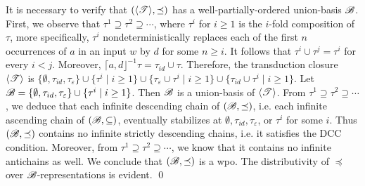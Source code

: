 \begin{example}
It is necessary to verify that $(\langle {\mathscr{T} } \rangle, \preceq)$ has a well-partially-ordered union-basis ${\mathscr{B} }$. First, we observe that $\tau^1 \supseteq \tau^2 \supseteq \cdots$, where $\tau^i$ for $i \ge 1$ is the $i$-fold composition of $\tau$, more specifically, $\tau^i$ nondeterministically replaces each of the first $n $ occurrences of $a$ in an input $w$ by $d$ for some $n \ge i$. It follows that $\tau^i \cup \tau^j = \tau^i$ for every $i < j$.
Moreover, $\lceil a, d \rfloor^{-1} \tau = \tau_{id} \cup \tau$. Therefore, the transduction closure $\langle {\mathscr{T} } \rangle$ is $\{\emptyset, \tau_{id}, \tau_\varepsilon\} \cup \{\tau^i \mid i \ge 1\} \cup \{\tau_{\varepsilon} \cup \tau^i \mid i \ge 1\} \cup \{\tau_{id} \cup \tau^i \mid i \ge 1\}$. Let ${\mathscr{B} } = \{\emptyset, \tau_{id}, \tau_\varepsilon\} \cup \{\tau^i \mid i \ge 1\}$. Then ${\mathscr{B} }$ is a union-basis of $\langle {\mathscr{T} } \rangle$. 
%
From $\tau^1 \supseteq \tau^2 \supseteq \cdots$, we deduce that each infinite descending chain of $({\mathscr{B} }, \preceq)$, i.e. each infinite ascending chain of $({\mathscr{B} }, \subseteq)$, eventually stabilizes at $\emptyset, \tau_{id}, \tau_\varepsilon$, or $\tau^i$ for some $i$. Thus $({\mathscr{B} }, \preceq)$ contains no infinite strictly descending chains, i.e. it satisfies the DCC condition. Moreover, from $\tau^1 \supseteq \tau^2 \supseteq \cdots$, we know that it contains no infinite antichains as well. We conclude that $({\mathscr{B} }, \preceq)$ is a wpo. The distributivity of $\preceq$ over ${\mathscr{B} }$-representations is evident. \qed
%
\end{example}

